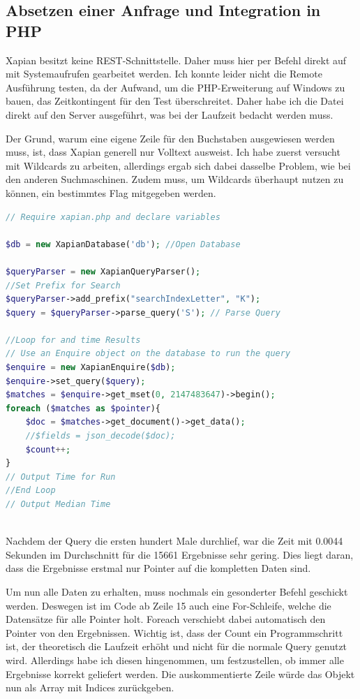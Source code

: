 \subsection{Absetzen einer Anfrage und Integration in PHP}

Xapian besitzt keine REST-Schnittstelle. Daher muss hier per Befehl direkt auf mit Systemaufrufen gearbeitet werden. Ich konnte leider nicht die Remote Ausführung testen, da der Aufwand, um die PHP-Erweiterung auf Windows zu bauen, das Zeitkontingent für den Test überschreitet. Daher habe ich die Datei direkt auf den Server ausgeführt, was bei der Laufzeit bedacht werden muss. 

Der Grund, warum eine eigene Zeile für den Buchstaben ausgewiesen werden muss, ist, dass Xapian generell nur Volltext ausweist. Ich habe zuerst versucht mit Wildcards zu arbeiten, allerdings ergab sich dabei dasselbe Problem, wie bei den anderen Suchmaschinen. Zudem muss, um Wildcards überhaupt nutzen zu können, ein bestimmtes Flag mitgegeben werden.

\begin{lstlisting}[language=php, frame=single, label={lst:XapPhpQuery}, 
	morekeywords={type,uninvertible,indexed,stored,field,multiValued, name}] 
// Require xapian.php and declare variables

$db = new XapianDatabase('db'); //Open Database

$queryParser = new XapianQueryParser();
//Set Prefix for Search
$queryParser->add_prefix("searchIndexLetter", "K"); 
$query = $queryParser->parse_query('S'); // Parse Query

//Loop for and time Results
// Use an Enquire object on the database to run the query
$enquire = new XapianEnquire($db);
$enquire->set_query($query);
$matches = $enquire->get_mset(0, 2147483647)->begin();
foreach ($matches as $pointer){
	$doc = $matches->get_document()->get_data();
	//$fields = json_decode($doc);
	$count++;
}
// Output Time for Run
//End Loop 
// Output Median Time
	
\end{lstlisting}

Nachdem der Query die ersten hundert Male durchlief, war die Zeit mit 0.0044 Sekunden im Durchschnitt für die 15661 Ergebnisse sehr gering. Dies liegt daran, dass die Ergebnisse erstmal nur Pointer auf die kompletten Daten sind. 

Um nun alle Daten zu erhalten, muss nochmals ein gesonderter Befehl geschickt werden. Deswegen ist im Code ab Zeile 15 auch eine For-Schleife, welche die Datensätze für alle Pointer holt. Foreach verschiebt dabei automatisch den Pointer von den Ergebnissen. Wichtig ist, dass der Count ein Programmschritt ist, der theoretisch die Laufzeit erhöht und nicht für die normale Query genutzt wird. Allerdings habe ich diesen hingenommen, um festzustellen, ob immer alle Ergebnisse korrekt geliefert werden. 
Die auskommentierte Zeile würde das Objekt nun als Array mit Indices zurückgeben. 

